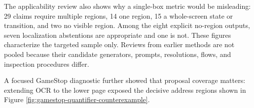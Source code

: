 The applicability review also shows why a single-box metric would be
misleading: 29 claims require multiple regions, 14 one region, 15 a whole-screen
state or transition, and two no visible region. Among the eight explicit
no-region outputs, seven localization abstentions are appropriate and one is
not. These figures characterize the
targeted sample only. Reviews from earlier methods are not pooled because their
candidate generators, prompts, resolutions, flows, and inspection procedures
differ.

A focused GameStop diagnostic further showed that proposal coverage matters:
extending OCR to the lower page exposed the decisive address regions shown in
Figure \ref{fig:gamestop-quantifier-counterexample}.
